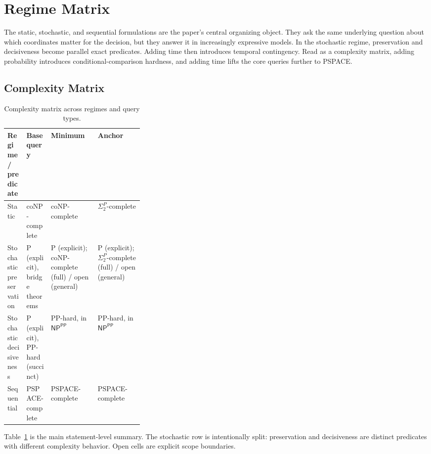 \section{Regime Matrix}\label{sec:regime-hierarchy}

The static, stochastic, and sequential formulations are the paper's central organizing object. They ask the same underlying question about which coordinates matter for the decision, but they answer it in increasingly expressive models. In the stochastic regime, preservation and decisiveness become parallel exact predicates. Adding time then introduces temporal contingency. Read as a complexity matrix, adding probability introduces conditional-comparison hardness, and adding time lifts the core queries further to PSPACE.

\subsection{Complexity Matrix}

\begin{table}[h]
\centering
\begingroup
\renewcommand{\tabularxcolumn}[1]{m{#1}}
\begin{tabularx}{\linewidth}{@{}>{\raggedright\arraybackslash\hyphenpenalty=10000\exhyphenpenalty=10000}m{0.14\linewidth}>{\raggedright\arraybackslash}m{0.18\linewidth}>{\raggedright\arraybackslash}X>{\raggedright\arraybackslash}X@{}}
\toprule
\textbf{Regime /} \textbf{predicate} & \textbf{Base query} & \textbf{Minimum} & \textbf{Anchor} \\
\midrule
Static & coNP-complete & coNP-complete & $\Sigma_2^P$-complete \\
\midrule
Stochastic preservation & P (explicit), bridge theorems & P (explicit); coNP-complete (full) / open (general) & P (explicit); $\Sigma_2^P$-complete (full) / open (general) \\
\midrule
Stochastic decisiveness & P (explicit), PP-hard (succinct) & PP-hard, in $\textsf{NP}^{\textsf{PP}}$ & PP-hard, in $\textsf{NP}^{\textsf{PP}}$ \\
\midrule
Sequential & PSPACE-complete & PSPACE-complete & PSPACE-complete \\
\bottomrule
\end{tabularx}
\caption{Complexity matrix across regimes and query types.}
\label{tab:regime-matrix}
\endgroup
\end{table}

Table~\ref{tab:regime-matrix} is the main statement-level summary. The stochastic row is intentionally split: preservation and decisiveness are distinct predicates with different complexity behavior. Open cells are explicit scope boundaries.

